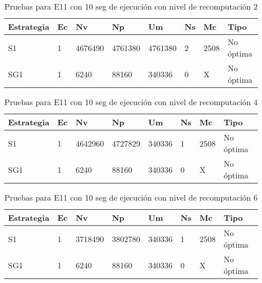 \begin{center}
\begin{longtable}{|p{3cm}|p{1.0cm}|p{1.6cm}|p{1.6cm}|p{1.1cm}|p{1.1cm}|p{1.1cm}|p{2.7cm}|}
	\caption{Pruebas para E11 con 10 seg de ejecución con nivel de recomputación 2}\\
	\hline
	\cellcolor[gray]{0.9} \textbf{Estrategia} & \cellcolor[gray]{0.9}\textbf{Ec} & \cellcolor[gray]{0.9}\textbf{Nv} & \cellcolor[gray]{0.9}\textbf{Np} & \cellcolor[gray]{0.9}\textbf{Um} & \cellcolor[gray]{0.9}\textbf{Ns} &  \cellcolor[gray]{0.9}\textbf{Mc} & \cellcolor[gray]{0.9}\textbf{Tipo}\\	\hline
	S1& 1 &4676490  &4761380 &4761380 &2 &2508&No óptima \\
	\hline
	SG1& 1 &6240  &88160 &340336  &0 &X&No óptima \\
	\hline
\end{longtable}	
\end{center}


\begin{center}
\begin{longtable}{|p{3cm}|p{1.0cm}|p{1.6cm}|p{1.6cm}|p{1.1cm}|p{1.1cm}|p{1.1cm}|p{2.7cm}|}
	\caption{Pruebas para E11 con 10 seg de ejecución con nivel de recomputación 4}\\
	\hline
	\cellcolor[gray]{0.9} \textbf{Estrategia} & \cellcolor[gray]{0.9}\textbf{Ec} & \cellcolor[gray]{0.9}\textbf{Nv} & \cellcolor[gray]{0.9}\textbf{Np} & \cellcolor[gray]{0.9}\textbf{Um} & \cellcolor[gray]{0.9}\textbf{Ns} &  \cellcolor[gray]{0.9}\textbf{Mc} & \cellcolor[gray]{0.9}\textbf{Tipo}\\	\hline
	S1& 1 &4642960  &4727829 &340336  &1 &2508&No óptima \\
	\hline
	SG1& 1 &6240  &88160 &340336  &0 &X&No óptima \\
	\hline
\end{longtable}	
\end{center}

\begin{center}
\begin{longtable}{|p{3cm}|p{1.0cm}|p{1.6cm}|p{1.6cm}|p{1.1cm}|p{1.1cm}|p{1.1cm}|p{2.7cm}|}
	\caption{Pruebas para E11 con 10 seg de ejecución con nivel de recomputación 6}\\
	\hline
	\cellcolor[gray]{0.9} \textbf{Estrategia} & \cellcolor[gray]{0.9}\textbf{Ec} & \cellcolor[gray]{0.9}\textbf{Nv} & \cellcolor[gray]{0.9}\textbf{Np} & \cellcolor[gray]{0.9}\textbf{Um} & \cellcolor[gray]{0.9}\textbf{Ns} &  \cellcolor[gray]{0.9}\textbf{Mc} & \cellcolor[gray]{0.9}\textbf{Tipo}\\	\hline
	S1& 1 &3718490  &3802780 &340336  &1 &2508&No óptima \\
	\hline
	SG1& 1 &6240  &88160 &340336  &0 &X&No óptima \\
	\hline
\end{longtable}	
\end{center}

